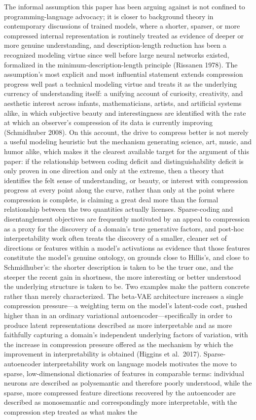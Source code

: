 \documentclass[11pt]{article}
\theoremstyle{plain}
\begin{document}
The informal assumption this paper has been arguing against is not confined to programming-language advocacy; it is closer to background theory in contemporary discussions of trained models, where a shorter, sparser, or more compressed internal representation is routinely treated as evidence of deeper or more genuine understanding, and description-length reduction has been a recognized modeling virtue since well before large neural networks existed, formalized in the minimum-description-length principle (Rissanen 1978). The assumption's most explicit and most influential statement extends compression progress well past a technical modeling virtue and treats it as the underlying currency of understanding itself: a unifying account of curiosity, creativity, and aesthetic interest across infants, mathematicians, artists, and artificial systems alike, in which subjective beauty and interestingness are identified with the rate at which an observer's compression of its data is currently improving (Schmidhuber 2008). On this account, the drive to compress better is not merely a useful modeling heuristic but the mechanism generating science, art, music, and humor alike, which makes it the clearest available target for the argument of this paper: if the relationship between coding deficit and distinguishability deficit is only proven in one direction and only at the extreme, then a theory that identifies the felt sense of understanding, or beauty, or interest with compression progress at every point along the curve, rather than only at the point where compression is complete, is claiming a great deal more than the formal relationship between the two quantities actually licenses. Sparse-coding and disentanglement objectives are frequently motivated by an appeal to compression as a proxy for the discovery of a domain's true generative factors, and post-hoc interpretability work often treats the discovery of a smaller, cleaner set of directions or features within a model's activations as evidence that those features constitute the model's genuine ontology, on grounds close to Hillis's, and close to Schmidhuber's: the shorter description is taken to be the truer one, and the steeper the recent gain in shortness, the more interesting or better understood the underlying structure is taken to be. Two examples make the pattern concrete rather than merely characterized. The beta-VAE architecture increases a single compression pressure---a weighting term on the model's latent-code cost, pushed higher than in an ordinary variational autoencoder---specifically in order to produce latent representations described as more interpretable and as more faithfully capturing a domain's independent underlying factors of variation, with the increase in compression pressure offered as the mechanism by which the improvement in interpretability is obtained (Higgins et al.\ 2017). Sparse-autoencoder interpretability work on language models motivates the move to sparse, low-dimensional dictionaries of features in comparable terms: individual neurons are described as polysemantic and therefore poorly understood, while the sparse, more compressed feature directions recovered by the autoencoder are described as monosemantic and correspondingly more interpretable, with the compression step treated as what makes the 
\end{document}
